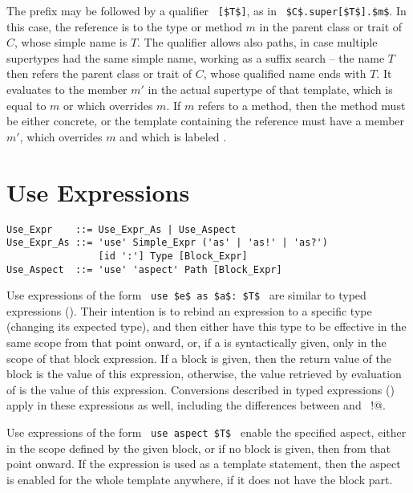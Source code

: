 The  prefix may be followed by a qualifier ~\lstinline![$T$]!, as in ~\lstinline!$C$.super[$T$].$m$!. In this case, the reference is to the type or method $m$ in the parent class or trait of $C$, whose simple name is $T$. The qualifier allows also paths, in case multiple supertypes had the same simple name, working as a suffix search -- the name $T$ then refers the parent class or trait of $C$, whose qualified name ends with $T$. It evaluates to the member $m'$ in the actual supertype of that template, which is equal to $m$ or which overrides $m$. If $m$ refers to a method, then the method must be either concrete, or the template containing the reference must have a member $m'$, which overrides $m$ and which is labeled . 






\section{Use Expressions}
\label{sec:use-expressions}

\syntax\begin{lstlisting}
Use_Expr    ::= Use_Expr_As | Use_Aspect
Use_Expr_As ::= 'use' Simple_Expr ('as' | 'as!' | 'as?')
                [id ':'] Type [Block_Expr]
Use_Aspect  ::= 'use' 'aspect' Path [Block_Expr]
\end{lstlisting}

Use expressions of the form ~\lstinline!use $e$ as $a$: $T$!~ are similar to typed expressions (). Their intention is to rebind an expression to a specific type (changing its expected type), and then either have this type to be effective in the same scope from that point onward, or, if a  is syntactically given, only in the scope of that block expression. If a block is given, then the return value of the block is the value of this expression, otherwise, the value retrieved by evaluation of  is the value of this expression. Conversions described in typed expressions () apply in these expressions as well, including the differences between  and ~\lstinline@as!@. 

Use expressions of the form ~\lstinline!use aspect $T$!~ enable the specified aspect, either in the scope defined by the given block, or if no block is given, then from that point onward. If the expression is used as a template statement, then the aspect is enabled for the whole template anywhere, if it does not have the block part. 








